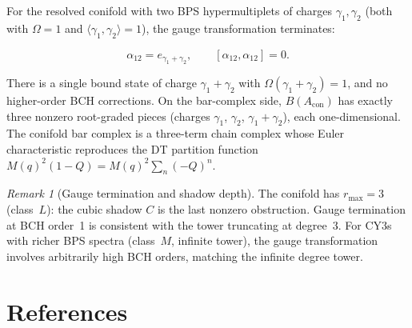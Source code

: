 \documentclass[11pt]{article}
\theoremstyle{definition}
\theoremstyle{remark}
\newtheorem{remark}[theorem]{Remark}
\begin{document}
For the resolved conifold with two BPS hypermultiplets of charges
$\gamma_1, \gamma_2$ (both with $\Omega = 1$ and
$\langle \gamma_1, \gamma_2 \rangle = 1$), the gauge
transformation terminates:

\[
 \alpha_{12} = e_{\gamma_1 + \gamma_2}, \qquad
 [\alpha_{12}, \alpha_{12}] = 0.
\]

\noindent
There is a single bound state of charge $\gamma_1 + \gamma_2$
with $\Omega(\gamma_1 + \gamma_2) = 1$, and no higher-order
BCH corrections. On the bar-complex side, $B(A_{\mathrm{con}})$
has exactly three nonzero root-graded pieces (charges $\gamma_1$,
$\gamma_2$, $\gamma_1 + \gamma_2$), each one-dimensional.
The conifold bar complex is a three-term chain complex whose
Euler characteristic reproduces the DT partition function
$M(q)^2 (1 - Q) = M(q)^2 \sum_n (-Q)^n$.

\begin{remark}[Gauge termination and shadow depth]
The conifold has $r_{\max} = 3$ (class~$L$): the cubic shadow
$C$ is the last nonzero obstruction. Gauge termination at BCH
order~1 is consistent with the tower truncating at degree~3.
For CY3s with richer BPS spectra (class~$M$, infinite
tower), the gauge transformation involves arbitrarily high BCH
orders, matching the infinite degree tower.
\end{remark}

\section*{References}
\label{sec:wc-refs}
\end{document}
